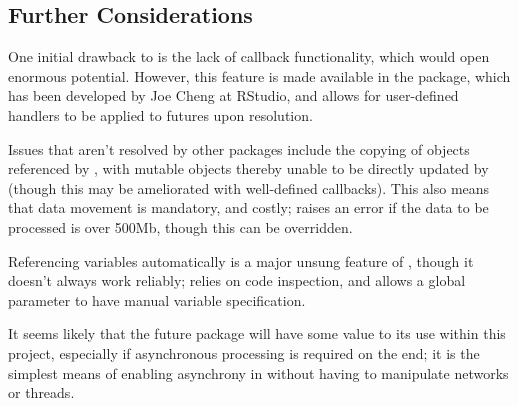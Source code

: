 \subsection{Further Considerations}\label{subsec:further-considerations}

One initial drawback to  is the lack of callback functionality,
which would open enormous potential. However, this feature is made
available in the  package, which has been developed by
Joe Cheng at RStudio, and allows for user-defined handlers to be
applied to futures upon resolution\cite{Cheng19}.

Issues that aren't resolved by other packages include the copying of
objects referenced by , with mutable objects thereby unable to be
directly updated by  (though this may be ameliorated with
well-defined callbacks). This also means that data movement is
mandatory, and costly;  raises an error if the data to be
processed is over 500Mb, though this can be overridden.

Referencing variables automatically is a major unsung feature of ,
though it doesn't always work reliably;  relies on code
inspection, and allows a global parameter to have manual
variable specification.

It seems likely that the future package will have some value to its
use within this project, especially if asynchronous processing is required on the \R{} end; it
is the simplest means of enabling asynchrony in \R{} without having to
manipulate networks or threads.
